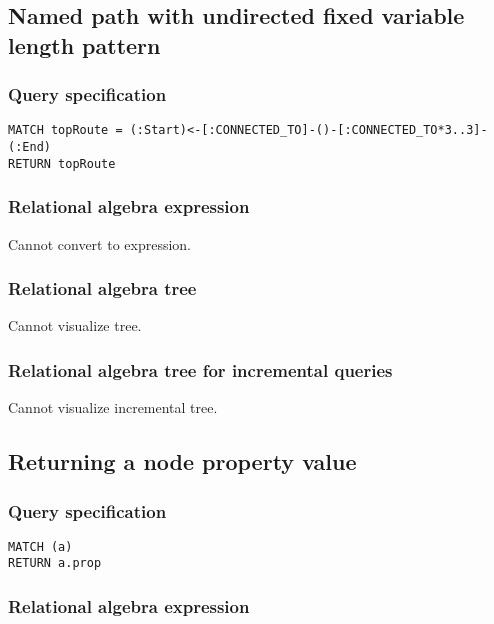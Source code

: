 \subsection{Named path with undirected fixed variable length pattern}

\subsubsection*{Query specification}

\begin{lstlisting}
MATCH topRoute = (:Start)<-[:CONNECTED_TO]-()-[:CONNECTED_TO*3..3]-(:End)
RETURN topRoute
\end{lstlisting}

\subsubsection*{Relational algebra expression}

Cannot convert to expression.

\subsubsection*{Relational algebra tree}

Cannot visualize tree.

\subsubsection*{Relational algebra tree for incremental queries}

Cannot visualize incremental tree.

\subsection{Returning a node property value}

\subsubsection*{Query specification}

\begin{lstlisting}
MATCH (a)
RETURN a.prop
\end{lstlisting}

\subsubsection*{Relational algebra expression}

